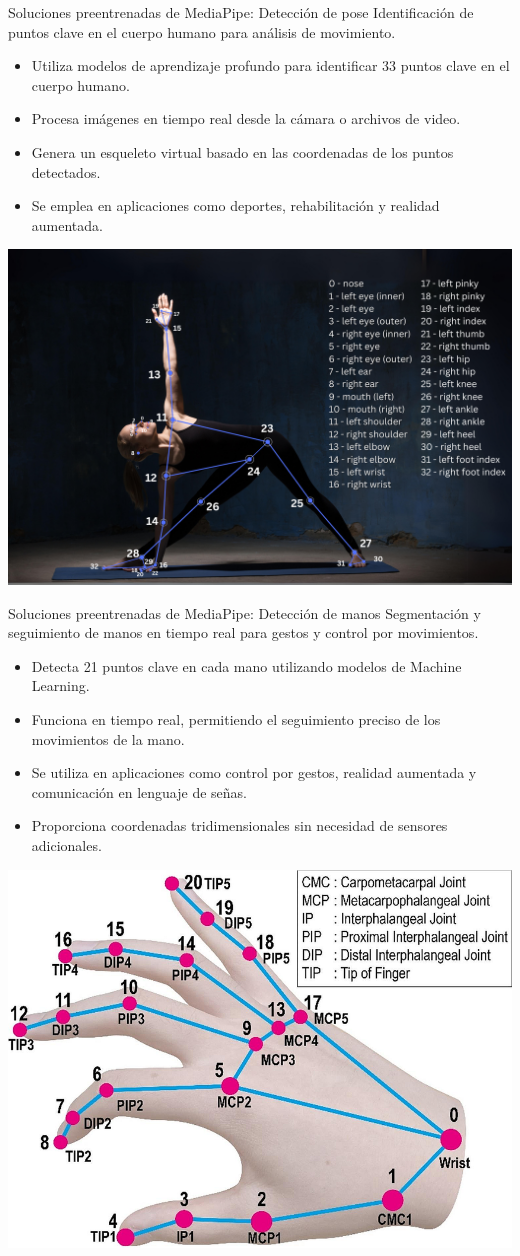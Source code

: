 \begin{frame}{Soluciones preentrenadas de MediaPipe: Detección de pose }
    Identificación de puntos clave en el cuerpo humano para análisis de movimiento.
    \begin{itemize}
        \item Utiliza modelos de aprendizaje profundo para identificar 33 puntos clave en el cuerpo humano.
        \item Procesa imágenes en tiempo real desde la cámara o archivos de video.
        \item Genera un esqueleto virtual basado en las coordenadas de los puntos detectados.
        \item Se emplea en aplicaciones como deportes, rehabilitación y realidad aumentada.
    \end{itemize}    
    \begin{center}
        \includegraphics[width=0.5\linewidth]{01_MediaPipe/pose_landmarks.png}
    \end{center}
\end{frame}

\begin{frame}{Soluciones preentrenadas de MediaPipe: Detección de manos}
    Segmentación y seguimiento de manos en tiempo real para gestos y control por movimientos.
   \begin{itemize}
        \item Detecta 21 puntos clave en cada mano utilizando modelos de Machine Learning.
        \item Funciona en tiempo real, permitiendo el seguimiento preciso de los movimientos de la mano.
        \item Se utiliza en aplicaciones como control por gestos, realidad aumentada y comunicación en lenguaje de señas.
        \item Proporciona coordenadas tridimensionales sin necesidad de sensores adicionales.
    \end{itemize}
    \begin{center}
        \includegraphics[width=0.5\linewidth]{01_MediaPipe/hand_landmarks.png}
    \end{center}
\end{frame}


